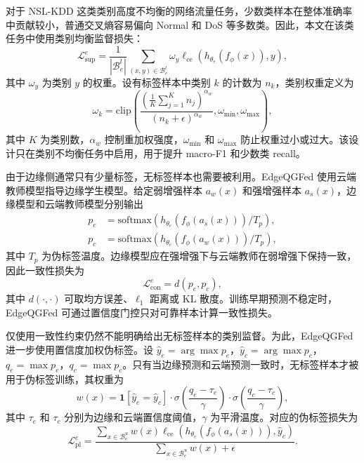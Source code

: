\documentclass[journal]{IEEEtran}
\begin{document}
对于 NSL-KDD 这类类别高度不均衡的网络流量任务，少数类样本在整体准确率中贡献较小，普通交叉熵容易偏向 Normal 和 DoS 等多数类。因此，本文在该类任务中使用类别均衡监督损失：
\begin{equation}
    \mathcal{L}_{\mathrm{sup}}^e =
    \frac{1}{|\mathcal{B}_e^l|}
    \sum_{(x,y)\in\mathcal{B}_e^l}
    \omega_y \ell_{\mathrm{ce}}\left(h_{\theta_e}(f_\phi(x)), y\right),
    \label{eq:weighted_sup_loss}
\end{equation}
其中 $\omega_y$ 为类别 $y$ 的权重。设有标签样本中类别 $k$ 的计数为 $n_k$，类别权重定义为
\begin{equation}
    \omega_k =
    \mathrm{clip}\left(
    \frac{
    \left(\frac{1}{K}\sum_{j=1}^{K}n_j\right)^{\alpha_w}
    }{
    (n_k+\epsilon)^{\alpha_w}
    },
    \omega_{\min}, \omega_{\max}
    \right),
    \label{eq:class_weight}
\end{equation}
其中 $K$ 为类别数，$\alpha_w$ 控制重加权强度，$\omega_{\min}$ 和 $\omega_{\max}$ 防止权重过小或过大。该设计只在类别不均衡任务中启用，用于提升 macro-F1 和少数类 recall。

由于边缘侧通常只有少量标签，无标签样本也需要被利用。EdgeQGFed 使用云端教师模型指导边缘学生模型。给定弱增强样本 $a_w(x)$ 和强增强样本 $a_s(x)$，边缘模型和云端教师模型分别输出
\begin{align}
    p_e &= \mathrm{softmax}\left(h_{\theta_e}(f_\phi(a_s(x)))/T_p\right), \nonumber\\
    p_c &= \mathrm{softmax}\left(h_{\theta_c}(f_\phi(a_w(x)))/T_p\right),
    \label{eq:edge_cloud_pred}
\end{align}
其中 $T_p$ 为伪标签温度。边缘模型应在强增强下与云端教师在弱增强下保持一致，因此一致性损失为
\begin{equation}
    \mathcal{L}_{\mathrm{con}}^e =
    d(p_e,p_c),
    \label{eq:consistency_loss}
\end{equation}
其中 $d(\cdot,\cdot)$ 可取均方误差、$\ell_1$ 距离或 KL 散度。训练早期预测不稳定时，EdgeQGFed 可通过置信度门控只对可靠样本计算一致性损失。

仅使用一致性约束仍然不能明确给出无标签样本的类别监督。为此，EdgeQGFed 进一步使用置信度加权伪标签。设 $\hat{y}_e=\arg\max p_e$，$\hat{y}_c=\arg\max p_c$，$q_e=\max p_e$，$q_c=\max p_c$。只有当边缘预测和云端预测一致时，无标签样本才被用于伪标签训练，其权重为
\begin{equation}
    w(x) =
    \mathbf{1}[\hat{y}_e=\hat{y}_c]
    \cdot
    \sigma\left(\frac{q_e-\tau_e}{\gamma}\right)
    \cdot
    \sigma\left(\frac{q_c-\tau_c}{\gamma}\right),
    \label{eq:pseudo_weight}
\end{equation}
其中 $\tau_e$ 和 $\tau_c$ 分别为边缘和云端置信度阈值，$\gamma$ 为平滑温度。对应的伪标签损失为
\begin{equation}
    \mathcal{L}_{\mathrm{pl}}^e =
    \frac{\sum_{x\in\mathcal{B}_e^u} w(x)
    \ell_{\mathrm{ce}}\left(h_{\theta_e}(f_\phi(a_s(x))), \hat{y}_c\right)}
    {\sum_{x\in\mathcal{B}_e^u} w(x)+\epsilon}.
    \label{eq:pseudo_loss}
\end{equation}
\end{document}
